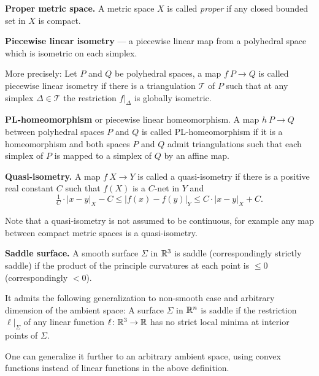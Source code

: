 \begin{description}
\item{\bf Proper metric space.}
\label{Proper metric space} 
A metric space $X$ is called \emph{proper} if any closed bounded set in $X$ is compact.

\item{\bf Piecewise linear isometry}%
%
\label{Piecewise linear isometry} --- a piecewise linear map from a polyhedral space which is isometric on each simplex. 

More precisely: Let $P$ and $Q$ be polyhedral spaces, a map $f\:P\to Q$ is called piecewise linear isometry if there is a triangulation $\mathcal{T}$ of $P$ such that at any simplex $\Delta\in \mathcal{T}$ the restriction $f|_\Delta$ is globally isometric.

\item{\bf  PL-homeomorphism}\label{PL-homeomorphism} or piecewise linear homeomorphism.
A map $h\:P\to Q$ between polyhedral spaces $P$ and $Q$ is called PL-homeomorphism if it is a homeomorphism and both spaces $P$ and $Q$ admit triangulations such that each simplex of $P$ is mapped to a simplex of $Q$ by an affine map.

\item{\bf  Quasi-isometry.}\label{Quasi-isometry} A map $f\:X\to Y$ is called a quasi-isometry if there is a positive real constant $C$ such that $f(X)$ is a $C$-net in $Y$ and
$$\tfrac{1}{C}\cdot|x-y|_X-C
\le 
|f(x)-f(y)|_Y\le C\cdot|x-y|_X+C.$$

Note that a quasi-isometry is not assumed to be continuous, for example any map between compact metric spaces is a quasi-isometry.

\item{\bf Saddle surface.}\label{Saddle surface} A smooth surface $\Sigma$ in $\mathbb{R}^3$ is saddle 
(correspondingly strictly saddle) 
if  the product of the principle curvatures at each point is $\le 0$ (correspondingly $<0$).

It admits the following generalization to non-smooth case and arbitrary dimension of the ambient space:
A surface $\Sigma$ in $\mathbb{R}^n$ is saddle if the restriction $\ell|_\Sigma$ of any linear function $\ell\colon\mathbb{R}^3\to\mathbb{R}$ has no strict local minima at interior points of $\Sigma$.

One can generalize it further to an arbitrary ambient space, using  convex functions instead of linear functions in the above definition.



\end{description}

